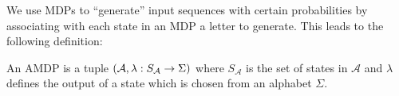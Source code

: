 We use \acp{MDP} to \enquote{generate} input sequences with certain
probabilities by associating with each state in an \ac{MDP} a letter to
generate. This leads to the following definition:
\begin{definition}
 An \acl{AMDP} is a tuple
 $\left(\mathcal{A}, \lambda: S_{\mathcal{A}}\rightarrow \Sigma\right)$
 where $S_{\mathcal{A}}$ is the set of states in $\mathcal{A}$ and $\lambda$
 defines the output of a state which is chosen from an alphabet $\Sigma$.
\end{definition}

